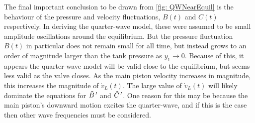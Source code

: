 The final important conclusion to be drawn from \cref{fig: QWNearEquil} is the behaviour of the pressure and velocity fluctuations, $B(t)$ and $C(t)$ respectively. In deriving the quarter-wave model, these were assumed to be small amplitude oscillations around the equilibrium. But the pressure fluctuation $B(t)$ in particular does not remain small for all time, but instead grows to an order of magnitude larger than the tank pressure as $y_1 \rightarrow 0$. Because of this, it appears the quarter-wave model will be valid close to the equilibrium, but seems less valid as the valve closes. As the main piston velocity increases in magnitude, this increases the magnitude of $\dot{v}_L(t)$. The large value of $\dot{v}_L(t)$ will likely dominate the equations for $\tilde{B} \,{'}$ and $\tilde{C} \,{'}$. One reason for this may be because the main piston's downward motion excites the quarter-wave, and if this is the case then other wave frequencies must be considered.